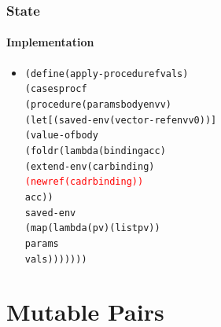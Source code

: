 \documentclass{beamer}
\begin{document}
\begin{frame}[fragile]
\frametitle{State}
\framesubtitle{Implementation}
\begin{scriptsize}
\begin{itemize}
\item<1->
\begin{alltt}
(define (apply-procedure f vals)
  (cases proc f
    (procedure (params body envv)
      (let [(saved-env (vector-ref envv 0))]
        (value-of body
                  (foldr (lambda (binding acc)
                           (extend-env (car binding)
                                       \textcolor{red}{(newref (cadr binding))}
                                       acc))
                         saved-env
                         (map (lambda (p v) (list p v))
                              params
                              vals)))))))
\end{alltt}

\end{itemize}
\end{scriptsize}
\end{frame}


\section{Mutable Pairs}
\end{document}
